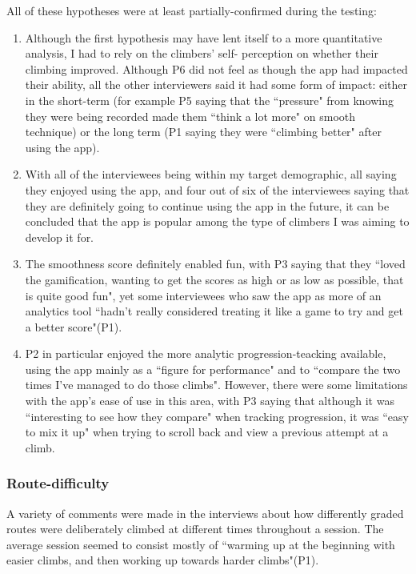 All of these hypotheses were at least partially-confirmed during the testing:
\begin{enumerate}
    \item Although the first hypothesis may have lent itself to a more quantitative analysis, I had to rely on the climbers' self- perception on whether their climbing improved. Although P6 did not feel as though the app had impacted their ability, all the other interviewers said it had some form of impact: either in the short-term (for example P5 saying that the ``pressure" from knowing they were being recorded made them ``think a lot more" on smooth technique) or the long term (P1 saying they were ``climbing better" after using the app).
    \item With all of the interviewees being within my target demographic, all saying they enjoyed using the app, and four out of six of the interviewees saying that they are definitely going to continue using the app in the future, it can be concluded that the app is popular among the type of climbers I was aiming to develop it for.
    \item The smoothness score definitely enabled fun, with P3 saying that they ``loved the gamification, wanting to get the scores as high or as low as possible, that is quite good fun", yet some interviewees who saw the app as more of an analytics tool ``hadn’t really considered treating it like a game to try and get a better score"(P1).
    \item P2 in particular enjoyed the more analytic progression-teacking available, using the app mainly as a ``figure for performance" and to ``compare the two times I've managed to do those climbs". However, there were some limitations with the app's ease of use in this area, with P3 saying that although it was ``interesting to see how they compare" when tracking progression, it was ``easy to mix it up" when trying to scroll back and view a previous attempt at a climb.
\end{enumerate}


\subsubsection{Route-difficulty}
A variety of comments were made in the interviews about how differently graded routes were deliberately climbed at different times throughout a session. 
The average session seemed to consist mostly of ``warming up at the beginning with easier climbs, and then working up towards harder climbs"(P1).

